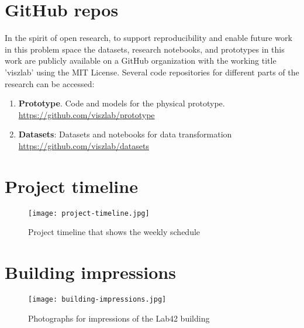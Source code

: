 \newpage

\appendix

\begin{appendices}


\section{GitHub repos}

In the spirit of open research, to support reproducibility and enable future work in this problem space the datasets, research notebooks, and prototypes in this work are publicly available on a GitHub organization with the working title 'viszlab' using the MIT License. Several code repositories for different parts of the research can be accessed:

\begin{enumerate}
  \item \textbf{Prototype}. Code and models for the physical prototype.\\
  \underline{https://github.com/viszlab/prototype}
  \item \textbf{Datasets}: Datasets and notebooks for data transformation  \\
  \underline{https://github.com/viszlab/datasets}
\end{enumerate}


\section{Project timeline}
\label{appendix:timeline}

\begin{figure}[H]
    \centering
    \captionsetup{justification=centering}
    \texttt{[image: project-timeline.jpg]}
    \caption{Project timeline that shows the weekly schedule}
    \label{fig:timeline}
\end{figure}

\section{Building impressions}
\label{appendix:building}

\begin{figure}[H]
    \centering
    \captionsetup{justification=centering}
    \texttt{[image: building-impressions.jpg]}
    \caption{Photographs for impressions of the Lab42 building}
    \label{fig:building}
\end{figure}

\end{appendices}